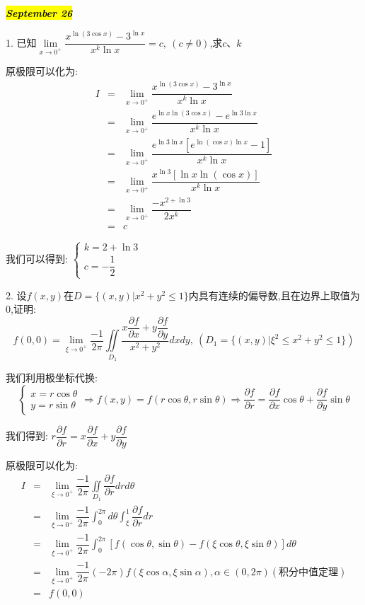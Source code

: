 \hl{\textbf{\textit{September 26}}}

1. 已知$\lim\limits_{x\rightarrow 0^{+}}\dfrac{x^{\ln (3\cos x)}-3^{\ln x}}{x^k\ln x}=c,\ (c\neq 0)$,求$c$、$k$
\begin{solution}

	原极限可以化为:  
	\begin{eqnarray*}
		I&=&\lim\limits_{x\rightarrow 0^{+}}\dfrac{x^{\ln (3\cos x)}-3^{\ln x}}{x^k\ln x}\\
		&=&\lim\limits_{x\rightarrow 0^{+}}\dfrac{e^{\ln x\ln (3\cos x)}-e^{\ln3\ln x}}{x^k\ln x}\\
		&=&\lim\limits_{x\rightarrow 0^{+}}\dfrac{e^{\ln3\ln x}[e^{\ln(\cos x)\ln x}-1]}{x^k\ln x}\\
		&=&\lim\limits_{x\rightarrow 0^{+}}\dfrac{x^{\ln3}[\ln x\ln(\cos x)]}{x^k\ln x}\\
		&=&\lim\limits_{x\rightarrow 0^{+}}\dfrac{-x^{2+\ln3}}{2x^k}\\
		&=&c
	\end{eqnarray*}
	
	我们可以得到:  $\left\lbrace
	\begin{array}{l}
		k=2+\ln3\\
		c=-\dfrac{1}{2}
	\end{array}
	\right. $
\end{solution}

2. 设$f(x,y)$在$D=\{(x,y)|x^2+y^2\leq 1\}$内具有连续的偏导数,且在边界上取值为$0$,证明:  
$$f(0,0)=\lim\limits_{\xi\rightarrow 0^{+}}\dfrac{-1}{2\pi}\iint\limits_{D_{1}}\dfrac{x\dfrac{\partial f}{\partial x}+y\dfrac{\partial f}{\partial y}}{x^2+y^2}dxdy,\ (D_{1}=\{(x,y)|\xi^{2}\leq x^2+y^2\leq 1\})$$
\begin{solution}

	我们利用极坐标代换:  
	$$\left\lbrace
	\begin{array}{l}
		x=r\cos\theta\\
		y=r\sin\theta
	\end{array}
	\right. \Rightarrow f(x,y)=f(r\cos\theta,r\sin\theta)\Rightarrow \dfrac{\partial f}{\partial r}=\dfrac{\partial f}{\partial x}\cos\theta+\dfrac{\partial f}{\partial y}\sin\theta$$
	
	我们得到:  $r\dfrac{\partial f}{\partial r}=x\dfrac{\partial f}{\partial x}+y\dfrac{\partial f}{\partial y}$
	
	原极限可以化为:  
	\begin{eqnarray*}
		I&=&\lim\limits_{\xi\rightarrow 0^{+}}\dfrac{-1}{2\pi}\iint\limits_{D_{1}}\dfrac{\partial f}{\partial r}drd\theta\\
		&=&\lim\limits_{\xi\rightarrow 0^{+}}\dfrac{-1}{2\pi}\int_{0}^{2\pi}d\theta\int_{\xi}^{1}\dfrac{\partial f}{\partial r}dr\\
		&=&\lim\limits_{\xi\rightarrow 0^{+}}\dfrac{-1}{2\pi}\int_{0}^{2\pi}[f(\cos\theta,\sin\theta)-f(\xi\cos\theta,\xi\sin\theta)]d\theta\\
		&=&\lim\limits_{\xi\rightarrow 0^{+}}\dfrac{-1}{2\pi}(-2\pi)f(\xi\cos\alpha,\xi\sin\alpha),\alpha\in(0,2\pi)(\text{积分中值定理})\\
		&=&f(0,0)
	\end{eqnarray*}
\end{solution}

